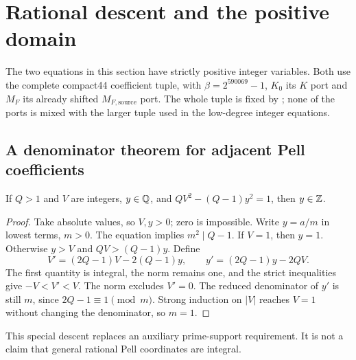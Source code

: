 \section{Rational descent and the positive domain}
The two equations in this section have strictly positive integer
variables. Both use the complete compact44 coefficient tuple, with
$\beta=2^{590069}-1$, $K_0$ its $K$ port and $M_F$ its already shifted
$M_{F,\mathrm{source}}$ port. The whole tuple is fixed by
; none of the ports is mixed
with the larger tuple used in the low-degree integer equations.

\subsection{A denominator theorem for adjacent Pell coefficients}
\begin{lemma}\label{lem:descent}
If $Q>1$ and $V$ are integers, $y\in\mathbb Q$, and
$QV^2-(Q-1)y^2=1$, then $y\in\mathbb Z$.
\end{lemma}
\begin{proof}
Take absolute values, so $V,y>0$; zero is impossible. Write $y=a/m$
in lowest terms, $m>0$. The equation implies $m^2\mid Q-1$.
If $V=1$, then $y=1$. Otherwise $y>V$ and $QV>(Q-1)y$.
Define
\[
 V'=(2Q-1)V-2(Q-1)y,\qquad y'=(2Q-1)y-2QV.
\]
The first quantity is integral, the norm remains one, and the strict
inequalities give $-V<V'<V$. The norm excludes $V'=0$.
The reduced denominator of $y'$ is still $m$, since $2Q-1\equiv1\pmod m$.
Strong induction on $|V|$ reaches $V=1$ without changing the denominator,
so $m=1$.
\end{proof}
This special descent replaces an auxiliary prime-support requirement.
It is not a claim that general rational Pell coordinates are integral.

